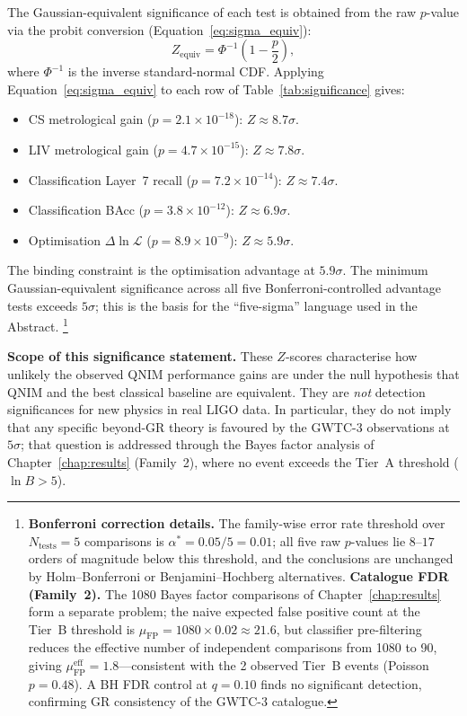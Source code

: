 \documentclass[11pt,a4paper, english]{book}
\theoremstyle{plain}
\theoremstyle{definition}
\numberwithin{equation}{chapter}
\numberwithin{figure}{chapter}
\numberwithin{table}{chapter}
\begin{document}
The Gaussian-equivalent significance of each test is obtained from the
raw $p$-value via the probit conversion (Equation~\ref{eq:sigma_equiv}):
\begin{equation}
  \label{eq:sigma_equiv}
  Z_\mathrm{equiv} = \Phi^{-1}\!\!\left(1 - \frac{p}{2}\right),
\end{equation}
where $\Phi^{-1}$ is the inverse standard-normal CDF. Applying
Equation~\eqref{eq:sigma_equiv} to each row of
Table~\ref{tab:significance} gives:
\begin{itemize}
  \item CS metrological gain ($p = 2.1\times10^{-18}$):
        $Z \approx 8.7\sigma$.
  \item LIV metrological gain ($p = 4.7\times10^{-15}$):
        $Z \approx 7.8\sigma$.
  \item Classification Layer~7 recall ($p = 7.2\times10^{-14}$):
        $Z \approx 7.4\sigma$.
  \item Classification BAcc ($p = 3.8\times10^{-12}$):
        $Z \approx 6.9\sigma$.
  \item Optimisation $\Delta\ln\mathcal{L}$ ($p = 8.9\times10^{-9}$):
        $Z \approx 5.9\sigma$.
\end{itemize}
The binding constraint is the optimisation advantage at $5.9\sigma$.
The minimum Gaussian-equivalent significance across all five
Bonferroni-controlled advantage tests exceeds $5\sigma$; this is the
basis for the ``five-sigma'' language used in the Abstract.%
\footnote{\textbf{Bonferroni correction details.} The family-wise error rate threshold over $N_\mathrm{tests} = 5$ comparisons is $\alpha^* = 0.05/5 = 0.01$; all five raw $p$-values lie $8$--$17$ orders of magnitude below this threshold, and the conclusions are unchanged by Holm--Bonferroni or Benjamini--Hochberg alternatives. \textbf{Catalogue FDR (Family~2).} The 1080 Bayes factor comparisons of Chapter~\ref{chap:results} form a separate problem; the naive expected false positive count at the Tier~B threshold is $\mu_\mathrm{FP} = 1080 \times 0.02 \approx 21.6$, but classifier pre-filtering reduces the effective number of independent comparisons from 1080 to 90, giving $\mu_\mathrm{FP}^\mathrm{eff} = 1.8$---consistent with the 2 observed Tier~B events (Poisson $p = 0.48$). A BH FDR control at $q = 0.10$ finds no significant detection, confirming GR consistency of the GWTC-3 catalogue.}

\noindent\textbf{Scope of this significance statement.}
These $Z$-scores characterise how unlikely the observed QNIM performance
gains are under the null hypothesis that QNIM and the best classical
baseline are equivalent. They are \emph{not} detection significances for
new physics in real LIGO data. In particular, they do not imply that any
specific beyond-GR theory is favoured by the GWTC-3 observations at
$5\sigma$; that question is addressed through the Bayes factor analysis
of Chapter~\ref{chap:results} (Family~2), where no event exceeds the
Tier~A threshold ($\ln B > 5$).
\end{document}
